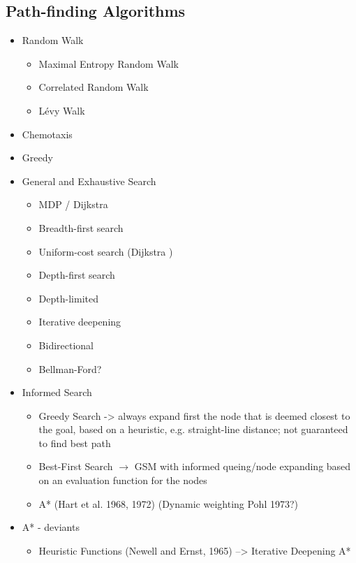 \subsection{Path-finding Algorithms}


\begin{itemize}
	\item Random Walk
	\begin{itemize}
		\item Maximal Entropy Random Walk
		\item Correlated Random Walk
		\item Lévy Walk
	\end{itemize}
	\item Chemotaxis
	\item Greedy
	\item General and Exhaustive Search \cite{russell1995, deo1984, korf1988}
	\begin{itemize}
		\item MDP / Dijkstra
		\item Breadth-first search
		\item Uniform-cost search (Dijkstra \cite{dijkstra1959})
		\item Depth-first search
		\item Depth-limited
		\item Iterative deepening
		\item Bidirectional
		\item Bellman-Ford?
	\end{itemize}
	\item Informed Search
	\begin{itemize}
		\item Greedy Search -> always expand first the node that is deemed closest to the goal, based on a heuristic, e.g. straight-line distance; not guaranteed to find best path
		\item Best-First Search $\rightarrow$ GSM with informed queing/node expanding based on an evaluation function for the nodes \cite{russell1995}
		\item A* (Hart et al. 1968, 1972) (Dynamic weighting Pohl 1973?)
	\end{itemize}
	\item A* - deviants
	\begin{itemize}
		\item Heuristic Functions (Newell and Ernst, 1965) --> Iterative Deepening A*

\end{itemize}
\end{itemize}
